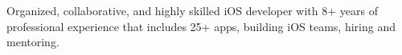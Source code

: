 

\begin{cventries}

Organized, collaborative, and highly skilled iOS developer with 8+ years of professional experience that includes 25+ apps, building iOS teams, hiring and mentoring.

\end{cventries}